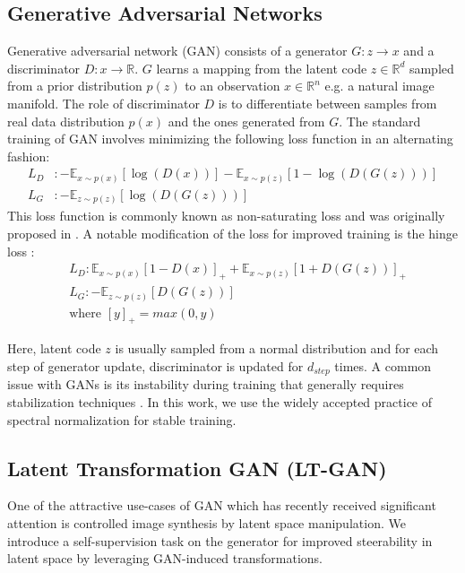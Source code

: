 \documentclass[10pt,twocolumn,letterpaper]{article}
\begin{document}
\subsection{Generative Adversarial Networks} 
Generative adversarial network (GAN) consists of a generator $G:z \rightarrow x $ and a discriminator $D:x \rightarrow \mathbb{R}$. $G$ learns a mapping from the latent code $z \in \mathbb{R}^d $ sampled from a prior distribution $p(z)$ to an observation $x \in \mathbb{R}^n$ e.g. a natural image manifold. The role of discriminator $D$ is to differentiate between samples from real data distribution $p(x)$ and the ones generated from $G$. The standard training of GAN involves minimizing the following loss function in an alternating fashion:
\begin{equation}
\begin{aligned}
    L_D &: - \mathbb{E}_{x  \sim p(x) } [\log(D(x))] - \mathbb{E}_{x \sim p(z) } [1- \log(D(G(z))) ] \\
    L_G &: - \mathbb{E}_{z \sim p(z) } [\log(D(G(z))) ]
\end{aligned}
\end{equation}
This loss function is commonly known as non-saturating loss and was originally proposed in \cite{gan_goodfellow}. A notable modification of the loss for improved training is the hinge loss \cite{hinge_loss_gan}: 
\begin{equation}
\begin{aligned}
    &L_D : \mathbb{E}_{x  \sim p(x) } [1 - D(x) ]_{+} + \mathbb{E}_{x \sim p(z) } [1 + D(G(z)) ]_{+} \\
    &L_G : - \mathbb{E}_{z \sim p(z) } [D(G(z)) ] \\
    &\text{where } [y]_{+} = max(0 , y)
\end{aligned}\label{eq:hinge-loss}
\end{equation}

Here, latent code $z$ is usually sampled from a normal distribution and for each step of generator update, discriminator is updated for $d_{step}$ times. A common issue with GANs is its instability during training that generally requires stabilization techniques \cite{inception2016,wgan_improved,sngan_proj}. In this work, we use the widely accepted practice of spectral normalization \cite{sngan_proj,biggan2018brock} for stable training. 

\subsection{Latent Transformation GAN (LT-GAN)}
One of the attractive use-cases of GAN which has recently received significant attention is controlled image synthesis by latent space manipulation. We introduce a self-supervision task on the generator for improved steerability in latent space by leveraging GAN-induced transformations. 
\end{document}
